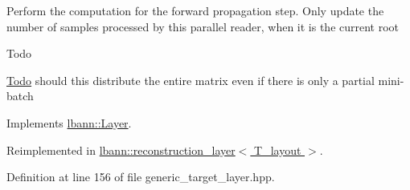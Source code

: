 Perform the computation for the forward propagation step. Only update the number of samples processed by this parallel reader, when it is the current root

\begin{DoxyRefDesc}{Todo}
\item[\hyperlink{todo__todo000023}{Todo}]should this distribute the entire matrix even if there is only a partial mini-\/batch \end{DoxyRefDesc}


Implements \hyperlink{classlbann_1_1Layer_a523319dd1bd87a0612afa1912bb5aad7}{lbann\+::\+Layer}.



Reimplemented in \hyperlink{classlbann_1_1reconstruction__layer_ad33ec2cccf89b317e22ec73b1761e427}{lbann\+::reconstruction\+\_\+layer$<$ T\+\_\+layout $>$}.



Definition at line 156 of file generic\+\_\+target\+\_\+layer.\+hpp.


